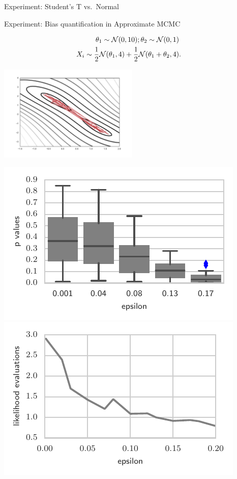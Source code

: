 \begin{frame}
\begin{columns}
\begin{column}{.32\linewidth}
\begin{block}{Experiment: Student's T vs.\ Normal}
\begin{minipage}{.35\linewidth}
\end{minipage}
\end{block}
\vspace{-0.75cm}
\begin{block}{Experiment: Bias quantification in Approximate MCMC}
\begin{minipage}{.60\linewidth}
\begin{align*}
\theta_{1}\sim{\cal N}(0,10);\theta_{2}\sim{\cal N}(0,1)\\
X_{i}\sim\frac{1}{2}{\cal N}(\theta_{1},4)+\frac{1}{2}{\cal N}(\theta_{1}+\theta_{2},4) & .
\end{align*}
\begin{center}
\includegraphics[width=0.5\textwidth]{img/sgld_trace_and_density.pdf}
\end{center}
\end{minipage}
\begin{minipage}{.35\linewidth}
           \includegraphics[width=.6\textwidth]{img/Heiko1}\\
            \includegraphics[width=.6\textwidth]{img/Heiko2}

\end{minipage}
\end{block}
\end{column}
\end{columns}
\end{frame}

